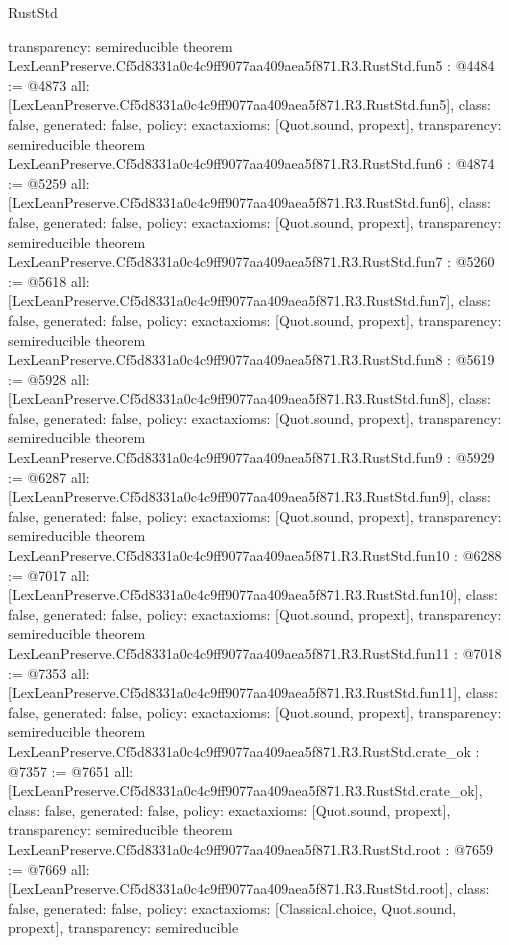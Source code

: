 \begin{lexlean}{RustStd}
\begin{coremodule}
{  transparency: semireducible
}
theorem LexLeanPreserve.Cf5d8331a0c4c9ff9077aa409aea5f871.R3.RustStd.fun5 : @4484 := @4873 {
  all: [LexLeanPreserve.Cf5d8331a0c4c9ff9077aa409aea5f871.R3.RustStd.fun5],
  class: false,
  generated: false,
  policy: exact{axioms: [Quot.sound, propext]},
  transparency: semireducible
}
theorem LexLeanPreserve.Cf5d8331a0c4c9ff9077aa409aea5f871.R3.RustStd.fun6 : @4874 := @5259 {
  all: [LexLeanPreserve.Cf5d8331a0c4c9ff9077aa409aea5f871.R3.RustStd.fun6],
  class: false,
  generated: false,
  policy: exact{axioms: [Quot.sound, propext]},
  transparency: semireducible
}
theorem LexLeanPreserve.Cf5d8331a0c4c9ff9077aa409aea5f871.R3.RustStd.fun7 : @5260 := @5618 {
  all: [LexLeanPreserve.Cf5d8331a0c4c9ff9077aa409aea5f871.R3.RustStd.fun7],
  class: false,
  generated: false,
  policy: exact{axioms: [Quot.sound, propext]},
  transparency: semireducible
}
theorem LexLeanPreserve.Cf5d8331a0c4c9ff9077aa409aea5f871.R3.RustStd.fun8 : @5619 := @5928 {
  all: [LexLeanPreserve.Cf5d8331a0c4c9ff9077aa409aea5f871.R3.RustStd.fun8],
  class: false,
  generated: false,
  policy: exact{axioms: [Quot.sound, propext]},
  transparency: semireducible
}
theorem LexLeanPreserve.Cf5d8331a0c4c9ff9077aa409aea5f871.R3.RustStd.fun9 : @5929 := @6287 {
  all: [LexLeanPreserve.Cf5d8331a0c4c9ff9077aa409aea5f871.R3.RustStd.fun9],
  class: false,
  generated: false,
  policy: exact{axioms: [Quot.sound, propext]},
  transparency: semireducible
}
theorem LexLeanPreserve.Cf5d8331a0c4c9ff9077aa409aea5f871.R3.RustStd.fun10 : @6288 := @7017 {
  all: [LexLeanPreserve.Cf5d8331a0c4c9ff9077aa409aea5f871.R3.RustStd.fun10],
  class: false,
  generated: false,
  policy: exact{axioms: [Quot.sound, propext]},
  transparency: semireducible
}
theorem LexLeanPreserve.Cf5d8331a0c4c9ff9077aa409aea5f871.R3.RustStd.fun11 : @7018 := @7353 {
  all: [LexLeanPreserve.Cf5d8331a0c4c9ff9077aa409aea5f871.R3.RustStd.fun11],
  class: false,
  generated: false,
  policy: exact{axioms: [Quot.sound, propext]},
  transparency: semireducible
}
theorem LexLeanPreserve.Cf5d8331a0c4c9ff9077aa409aea5f871.R3.RustStd.crate_ok : @7357 := @7651 {
  all: [LexLeanPreserve.Cf5d8331a0c4c9ff9077aa409aea5f871.R3.RustStd.crate_ok],
  class: false,
  generated: false,
  policy: exact{axioms: [Quot.sound, propext]},
  transparency: semireducible
}
theorem LexLeanPreserve.Cf5d8331a0c4c9ff9077aa409aea5f871.R3.RustStd.root : @7659 := @7669 {
  all: [LexLeanPreserve.Cf5d8331a0c4c9ff9077aa409aea5f871.R3.RustStd.root],
  class: false,
  generated: false,
  policy: exact{axioms: [Classical.choice, Quot.sound, propext]},
  transparency: semireducible
}


\end{coremodule}
\end{lexlean}

